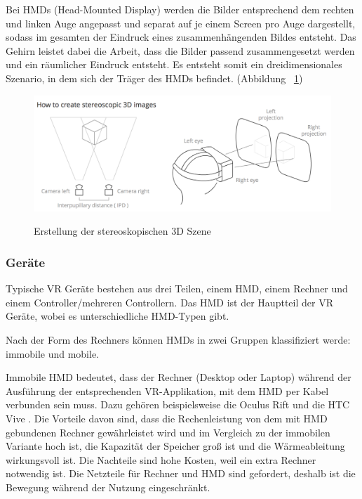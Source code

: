 Bei HMDs (Head-Mounted Display) werden die Bilder entsprechend dem rechten und linken Auge angepasst und separat auf je einem Screen pro Auge dargestellt, sodass im gesamten der Eindruck eines zusammenhängenden Bildes entsteht. Das Gehirn leistet dabei die Arbeit, dass die Bilder passend zusammengesetzt werden und ein räumlicher Eindruck entsteht. Es entsteht somit ein dreidimensionales Szenario, in dem sich der Träger des HMDs befindet. (Abbildung ~\ref{fig:howToCreate})

\begin{figure}[ht]
\vspace*{1em}
\centering
\caption{Erstellung der stereoskopischen 3D Szene}
\includegraphics[width=\textwidth]{images/howToCreate.png}
\label{fig:howToCreate} 
\end{figure}

  \subsubsection{Geräte}
  Typische VR Geräte bestehen aus drei Teilen, einem HMD, einem Rechner und einem Controller/mehreren Controllern. Das HMD ist der Hauptteil der VR Geräte, wobei es unterschiedliche HMD-Typen gibt.
  
  Nach der Form des Rechners können HMDs in zwei Gruppen klassifiziert werde: immobile und mobile.
  
  Immobile HMD bedeutet, dass der Rechner (Desktop oder Laptop) während der Ausführung der entsprechenden VR-Applikation, mit dem HMD per Kabel verbunden sein muss. Dazu gehören beispielsweise die Oculus Rift \citep{31} und die HTC Vive \citep{32}. Die Vorteile davon sind, dass die Rechenleistung von dem mit HMD gebundenen Rechner gewährleistet wird und im Vergleich zu der immobilen Variante hoch ist, die Kapazität der Speicher groß ist und die Wärmeableitung wirkungsvoll ist. Die Nachteile sind hohe Kosten, weil ein extra Rechner notwendig ist. Die Netzteile für Rechner und HMD sind gefordert, deshalb ist die Bewegung während der Nutzung eingeschränkt.
  
